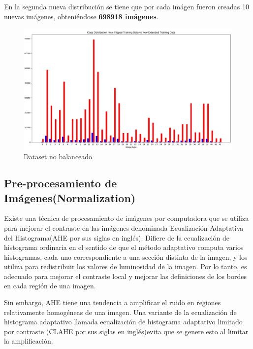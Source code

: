 	En la segunda nueva distribución se tiene que por cada imágen fueron creadas 10 nuevas imágenes, obteniéndose {\bf 698918 imágenes}.
	\begin{figure}[H]
		\includegraphics[width=1\textwidth]{images/desarrollo/histograms/train_extended_per_10_698918}
		\begin{center}
		\caption{\small{Dataset no balanceado}}
		\vspace{-1em}
		{\small{\fontsize{10}{16.8}\selectfont {Fuente propia}}}
		\end{center}
		\vspace{-1.5em}
	\end{figure}


\subsection{Pre-procesamiento de Imágenes(Normalization)}
	Existe una técnica de procesamiento de imágenes por computadora que se utiliza para mejorar el contraste en las imágenes denominada Ecualización Adaptativa del Histograma(AHE por sus siglas en inglés). Difiere de la ecualización de histograma ordinaria en el sentido de que el método adaptativo computa varios histogramas, cada uno correspondiente a una sección distinta de la imagen, y los utiliza para redistribuir los valores de luminosidad de la imagen. Por lo tanto, es adecuado para mejorar el contraste local y mejorar las definiciones de los bordes en cada región de una imagen.

	Sin embargo, AHE tiene una tendencia a amplificar el ruido en regiones relativamente homogéneas de una imagen. Una variante de la ecualización de histograma adaptativo llamada ecualización de histograma adaptativo limitado por contraste (CLAHE por sus siglas en inglés)evita que se genere esto al limitar la amplificación.


